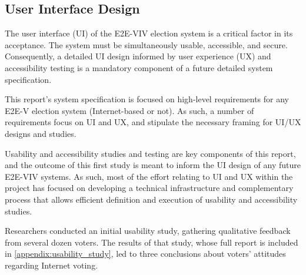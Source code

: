 \subsection{User Interface Design}
\label{sec:user-interf-design}

The user interface (UI) of the E2E-VIV election system is a critical
factor in its acceptance. The system must be simultaneously usable,
accessible, and secure. Consequently, a detailed UI design informed by
user experience (UX) and accessibility testing is a mandatory
component of a future detailed system specification.

This report’s system specification is focused on high-level
requirements for any E2E-V election system (Internet-based or not). As
such, a number of requirements focus on UI and UX, and stipulate the
necessary framing for UI/UX designs and studies.

Usability and accessibility studies and testing are key components of
this report, and the outcome of this first study is meant to inform
the UI design of any future E2E-VIV systems. As such, most of the
effort relating to UI and UX within the project has focused on
developing a technical infrastructure and complementary process that
allows efficient definition and execution of usability and
accessibility studies.

Researchers conducted an initial usability study, gathering
qualitative feedback from several dozen voters. The results of that
study, whose full report is included in
\autoref{appendix:usability_study}, led to three conclusions about
voters’ attitudes regarding Internet voting.


